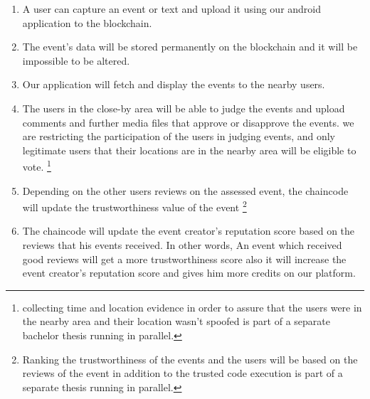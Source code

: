        \begin{enumerate}
	 \item {A user can capture an event or text and upload it using our android application to the blockchain.}
	 \item {The event's data will be stored permanently on the blockchain and it will be impossible to be altered.} 
	 \item {Our application will fetch and display the events to the nearby users.} 
         \item {The users in the close-by area will be able to judge the events and upload comments and further media files that approve or disapprove the events.  we are restricting the participation of the users in judging events, and only legitimate users that their locations are in the nearby area will be eligible to vote. \footnote[1]{collecting time and location evidence in order to assure that the users were in the nearby area and their location wasn't spoofed  is part of a separate bachelor thesis running in parallel.} }
         \item {Depending on the other users reviews on the assessed event, the chaincode will update the trustworthiness value of the event \footnote[2]{Ranking the trustworthiness of the events and the users will be based on the reviews of the event in addition to the trusted code execution is part of a separate thesis running in parallel. } }
          \item {The chaincode will update the event creator's reputation score based on the reviews that his events received. In other words, An event which received good reviews will get a more trustworthiness score also it will increase the event creator's reputation score and gives him more credits on our platform.} 
	\end{enumerate}

